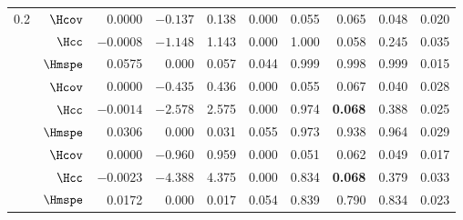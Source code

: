 \begin{table}[htbp]
\begin{tabular}{lrrrrrrrrr}
\midrule
0.2 & $\Hcov$ & 0.0000 & $-0.137$ & 0.138 & 0.000 & \cellcolor{black!10}0.055 & 0.065 & 0.048 & 0.020 \\
 & $\Hcc$ & $-0.0008$ & $-1.148$ & 1.143 & 0.000 & 1.000 & \cellcolor{black!10}0.058 & 0.245 & 0.035 \\
 & $\Hmspe$ & 0.0575 & 0.000 & 0.057 & \cellcolor{black!10}0.044 & 0.999 & 0.998 & 0.999 & 0.015 \\
\addlinespace
0.5 & $\Hcov$ & 0.0000 & $-0.435$ & 0.436 & 0.000 & \cellcolor{black!10}0.055 & 0.067 & 0.040 & 0.028 \\
 & $\Hcc$ & $-0.0014$ & $-2.578$ & 2.575 & 0.000 & 0.974 & \cellcolor{black!10}\textbf{0.068} & 0.388 & 0.025 \\
 & $\Hmspe$ & 0.0306 & 0.000 & 0.031 & \cellcolor{black!10}0.055 & 0.973 & 0.938 & 0.964 & 0.029 \\
\addlinespace
1.0 & $\Hcov$ & 0.0000 & $-0.960$ & 0.959 & 0.000 & \cellcolor{black!10}0.051 & 0.062 & 0.049 & 0.017 \\
 & $\Hcc$ & $-0.0023$ & $-4.388$ & 4.375 & 0.000 & 0.834 & \cellcolor{black!10}\textbf{0.068} & 0.379 & 0.033 \\
 & $\Hmspe$ & 0.0172 & 0.000 & 0.017 & \cellcolor{black!10}0.054 & 0.839 & 0.790 & 0.834 & 0.023 \\
\bottomrule
\end{tabular}
\end{table}
